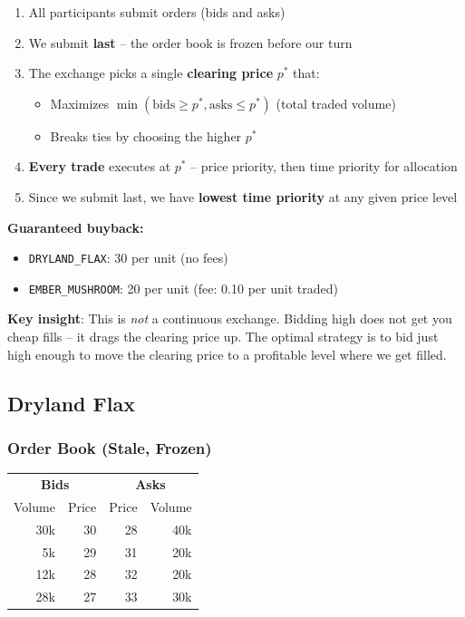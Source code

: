 \documentclass[11pt,a4paper]{article}
\begin{document}
\begin{enumerate}
    \item All participants submit orders (bids and asks)
    \item We submit \textbf{last} -- the order book is frozen before our turn
    \item The exchange picks a single \textbf{clearing price} $p^*$ that:
    \begin{itemize}
        \item Maximizes $\min(\text{bids} \geq p^*, \text{asks} \leq p^*)$ (total traded volume)
        \item Breaks ties by choosing the higher $p^*$
    \end{itemize}
    \item \textbf{Every trade} executes at $p^*$ -- price priority, then time priority for allocation
    \item Since we submit last, we have \textbf{lowest time priority} at any given price level
\end{enumerate}

\textbf{Guaranteed buyback:}
\begin{itemize}
    \item \texttt{DRYLAND\_FLAX}: 30 per unit (no fees)
    \item \texttt{EMBER\_MUSHROOM}: 20 per unit (fee: 0.10 per unit traded)
\end{itemize}

\textbf{Key insight}: This is \textit{not} a continuous exchange. Bidding high does not get you cheap fills -- it drags the clearing price up. The optimal strategy is to bid just high enough to move the clearing price to a profitable level where we get filled.

\subsection{Dryland Flax}

\subsubsection{Order Book (Stale, Frozen)}

\begin{table}[H]
\centering
\begin{tabular}{@{}rr|rr@{}}
\toprule
\multicolumn{2}{c|}{\textbf{Bids}} & \multicolumn{2}{c}{\textbf{Asks}} \\
Volume & Price & Price & Volume \\
\midrule
30k & 30 & 28 & 40k \\
5k  & 29 & 31 & 20k \\
12k & 28 & 32 & 20k \\
28k & 27 & 33 & 30k \\
\bottomrule
\end{tabular}
\end{table}
\end{document}
